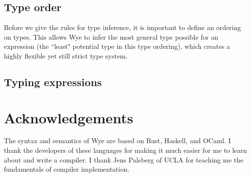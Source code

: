\documentclass[a4paper, 12pt]{article}
\theoremstyle{myplain}
\theoremstyle{mydefinition}
\theoremstyle{myremark}
\numberwithin{equation} {section}
\numberwithin{figure}   {section}
\numberwithin{table}    {section}
\begin{document}
\subsection{Type order}

Before we give the rules for type inference, it is important to define an ordering on types. This allows Wye to infer the most general type possible for an expression (the ``least" potential type in this type ordering), which creates a highly flexible yet still strict type system.

\subsection{Typing expressions}




\pagebreak
\section{Acknowledgements}
The syntax and semantics of Wye are based on Rust, Haskell, and OCaml. I thank the developers of these languages for making it much easier for me to learn about and write a compiler. I thank Jens Palsberg of UCLA for teaching me the fundamentals of compiler implementation.

\pagebreak



\end{document}

